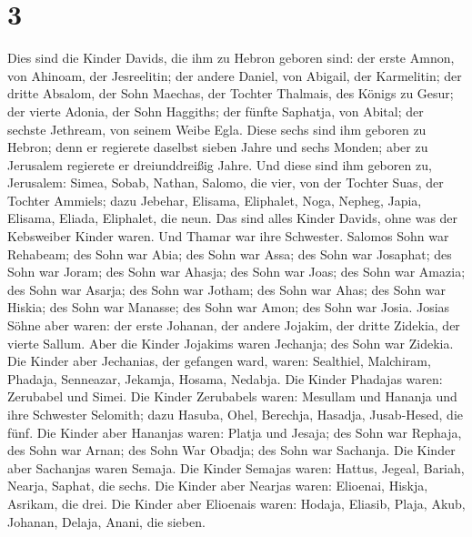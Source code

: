 \hypertarget{section-2}{%
\section{3}\label{section-2}}

 Dies sind die Kinder Davids, die ihm zu Hebron geboren
sind: der erste Amnon, von Ahinoam, der Jesreelitin; der andere Daniel,
von Abigail, der Karmelitin;  der dritte Absalom, der Sohn
Maechas, der Tochter Thalmais, des Königs zu Gesur; der vierte Adonia,
der Sohn Haggiths;  der fünfte Saphatja, von Abital; der
sechste Jethream, von seinem Weibe Egla.  Diese sechs sind
ihm geboren zu Hebron; denn er regierete daselbst sieben Jahre und sechs
Monden; aber zu Jerusalem regierete er dreiunddreißig Jahre.
 Und diese sind ihm geboren zu, Jerusalem: Simea, Sobab,
Nathan, Salomo, die vier, von der Tochter Suas, der Tochter Ammiels;
 dazu Jebehar, Elisama, Eliphalet,  Noga,
Nepheg, Japia,  Elisama, Eliada, Eliphalet, die neun.
 Das sind alles Kinder Davids, ohne was der Kebsweiber
Kinder waren. Und Thamar war ihre Schwester.  Salomos Sohn
war Rehabeam; des Sohn war Abia; des Sohn war Assa; des Sohn war
Josaphat;  des Sohn war Joram; des Sohn war Ahasja; des
Sohn war Joas;  des Sohn war Amazia; des Sohn war Asarja;
des Sohn war Jotham;  des Sohn war Ahas; des Sohn war
Hiskia; des Sohn war Manasse;  des Sohn war Amon; des Sohn
war Josia.  Josias Söhne aber waren: der erste Johanan, der
andere Jojakim, der dritte Zidekia, der vierte Sallum. 
Aber die Kinder Jojakims waren Jechanja; des Sohn war Zidekia.
 Die Kinder aber Jechanias, der gefangen ward, waren:
Sealthiel,  Malchiram, Phadaja, Senneazar, Jekamja, Hosama,
Nedabja.  Die Kinder Phadajas waren: Zerubabel und Simei.
Die Kinder Zerubabels waren: Mesullam und Hananja und ihre Schwester
Selomith;  dazu Hasuba, Ohel, Berechja, Hasadja,
Jusab-Hesed, die fünf.  Die Kinder aber Hananjas waren:
Platja und Jesaja; des Sohn war Rephaja, des Sohn war Arnan; des Sohn
War Obadja; des Sohn war Sachanja.  Die Kinder aber
Sachanjas waren Semaja. Die Kinder Semajas waren: Hattus, Jegeal,
Bariah, Nearja, Saphat, die sechs.  Die Kinder aber Nearjas
waren: Elioenai, Hiskja, Asrikam, die drei.  Die Kinder
aber Elioenais waren: Hodaja, Eliasib, Plaja, Akub, Johanan, Delaja,
Anani, die sieben.

